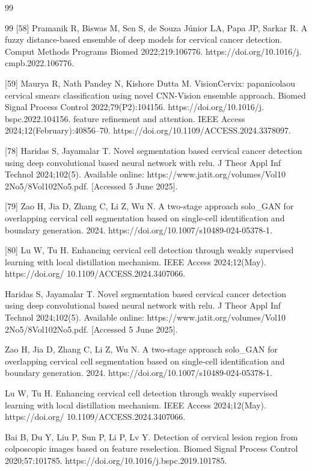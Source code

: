 \documentclass{svjour3}
\begin{document}
\begin{thebibliography}{99}
\begin{thebibliography}{99}
 [58] Pramanik R, Biswas M, Sen S, de Souza Júnior LA, Papa JP, Sarkar R. A fuzzy distance-based ensemble of deep models for cervical cancer detection. Comput Methods Programs Biomed 2022;219:106776. https://doi.org/10.1016/j. cmpb.2022.106776.

 [59] Maurya R, Nath Pandey N, Kishore Dutta M. VisionCervix: papanicolaou cervical smears classification using novel CNN-Vision ensemble approach. Biomed Signal Process Control 2022;79(P2):104156. https://doi.org/10.1016/j. bspc.2022.104156. feature refinement and attention. IEEE Access 2024;12(February):40856–70. https://doi.org/10.1109/ACCESS.2024.3378097.

 [78] Haridas S, Jayamalar T. Novel segmentation based cervical cancer detection using deep convolutional based neural network with relu. J Theor Appl Inf Technol 2024;102(5). Available online: https://www.jatit.org/volumes/Vol10 2No5/8Vol102No5.pdf. [Accessed 5 June 2025].

 [79] Zao H, Jia D, Zhang C, Li Z, Wu N. A two-stage approach solo_GAN for overlapping cervical cell segmentation based on single-cell identification and boundary generation. 2024. https://doi.org/10.1007/s10489-024-05378-1.

 [80] Lu W, Tu H. Enhancing cervical cell detection through weakly supervised learning with local distillation mechanism. IEEE Access 2024;12(May). https://doi.org/ 10.1109/ACCESS.2024.3407066.

 Haridas S, Jayamalar T. Novel segmentation based cervical cancer detection using deep convolutional based neural network with relu. J Theor Appl Inf Technol 2024;102(5). Available online: https://www.jatit.org/volumes/Vol10 2No5/8Vol102No5.pdf. [Accessed 5 June 2025].

 Zao H, Jia D, Zhang C, Li Z, Wu N. A two-stage approach solo_GAN for overlapping cervical cell segmentation based on single-cell identification and boundary generation. 2024. https://doi.org/10.1007/s10489-024-05378-1.

 Lu W, Tu H. Enhancing cervical cell detection through weakly supervised learning with local distillation mechanism. IEEE Access 2024;12(May). https://doi.org/ 10.1109/ACCESS.2024.3407066.

 Bai B, Du Y, Liu P, Sun P, Li P, Lv Y. Detection of cervical lesion region from colposcopic images based on feature reselection. Biomed Signal Process Control 2020;57:101785. https://doi.org/10.1016/j.bspc.2019.101785.


\end{thebibliography}
\end{thebibliography}
\end{document}
